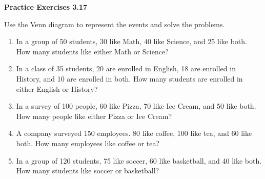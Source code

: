 \vspace{0.3ex}
\noindent\textbf{Practice Exercises 3.17}

\vspace{0.2ex}

Use the Venn diagram to represent the events and solve the problems.

\begin{enumerate}[label=\color{blue}\arabic*.]
    \item In a group of 50 students, 30 like Math, 40 like Science, and 25 like both. How many students like either Math or Science?
    \item In a class of 35 students, 20 are enrolled in English, 18 are enrolled in History, and 10 are enrolled in both. How many students are enrolled in either English or History?
    \item In a survey of 100 people, 60 like Pizza, 70 like Ice Cream, and 50 like both. How many people like either Pizza or Ice Cream?
    \item A company surveyed 150 employees. 80 like coffee, 100 like tea, and 60 like both. How many employees like coffee or tea?
    \item In a group of 120 students, 75 like soccer, 60 like basketball, and 40 like both. How many students like soccer or basketball?
\end{enumerate}
